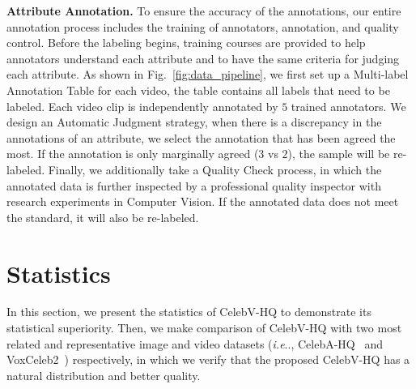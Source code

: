 \documentclass[runningheads]{llncs}
\makeatletter
\DeclareRobustCommand\onedot{\futurelet\@let@token\@onedot}
\def\@onedot{\ifx\@let@token.\else.\null\fi\xspace}
\def\ie{\emph{i.e}\onedot} \def\Ie{\emph{I.e}\onedot}
\makeatother
\begin{document}
\noindent
\textbf{Attribute Annotation.}
To ensure the accuracy of the annotations, our entire annotation process includes the training of annotators, annotation, and quality control. 
Before the labeling begins, training courses are provided to help annotators understand each attribute and to have the same criteria for judging each attribute. 
As shown in Fig.~\ref{fig:data_pipeline}, we first set up a Multi-label Annotation Table for each video, the table contains all labels that need to be labeled. Each video clip is independently annotated by $5$ trained annotators. 
We design an Automatic Judgment strategy, when there is a discrepancy in the annotations of an attribute, we select the annotation that has been agreed the most. If the annotation is only marginally agreed ($3$ vs $2$), the sample will be re-labeled.
Finally, we additionally take a Quality Check process, in which the annotated data is further inspected by a professional quality inspector with research experiments in Computer Vision. If the annotated data does not meet the standard, it will also be re-labeled.

\section{Statistics}


In this section, we present the statistics of CelebV-HQ to demonstrate its statistical superiority. 
Then, we make comparison of CelebV-HQ with two most related and representative image and video datasets (\ie, CelebA-HQ~\cite{celebahq} and VoxCeleb2~\cite{vox2}) respectively, in which we verify that the proposed CelebV-HQ has a natural distribution and better quality.
\end{document}
